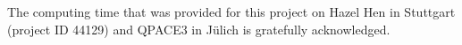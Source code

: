 \documentclass[graybox]{svmult}
\begin{document}
%
\begin{acknowledgement}
The computing time that was provided for this project on Hazel Hen in Stuttgart (project ID 44129) and
QPACE3 in J\"ulich is gratefully acknowledged.
\end{acknowledgement}



\end{document}
